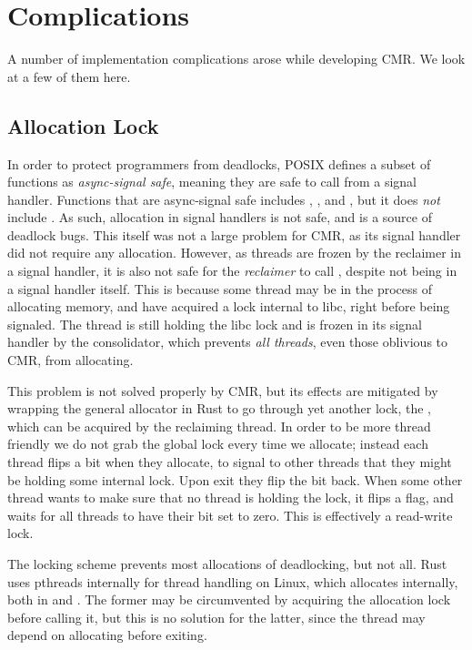 \section{Complications\label{sec:impl-complications}}

A number of implementation complications arose while developing CMR\@. We look at a few of them
here.

\subsection{Allocation Lock\label{sec:alloc-lock}}

In order to protect programmers from deadlocks, POSIX defines a subset of functions as
\emph{async-signal safe}, meaning they are safe to call from a signal handler. Functions that are
async-signal safe includes , , and , but it does \emph{not}
include . As such, allocation in signal handlers is not safe, and is a source of
deadlock bugs. This itself was not a large problem for CMR, as its signal handler did not require
any allocation. However, as threads are frozen by the reclaimer in a signal handler, it is also not
safe for the \emph{reclaimer} to call , despite not being in a signal handler itself.
This is because some thread may be in the process of allocating memory, and have acquired a lock
internal to libc, right before being signaled. The thread is still holding the libc lock and is
frozen in its signal handler by the consolidator, which prevents \emph{all threads}, even those
oblivious to CMR, from allocating.

This problem is not solved properly by CMR, but its effects are mitigated by wrapping the general
allocator in Rust to go through yet another lock, the , which can be acquired by
the reclaiming thread.  In order to be more thread friendly we do not grab the global lock every
time we allocate; instead each thread flips a bit when they allocate, to signal to other threads
that they might be holding some internal lock. Upon exit they flip the bit back. When some other
thread wants to make sure that no thread is holding the lock, it flips a flag, and waits for all
threads to have their bit set to zero. This is effectively a read-write lock.

The locking scheme prevents most allocations of deadlocking, but not all. Rust uses \gls{pthreads}
internally for thread handling on Linux, which allocates internally, both in  and
. The former may be circumvented by acquiring the allocation lock before calling it, but
this is no solution for the latter, since the thread may depend on allocating before exiting.


